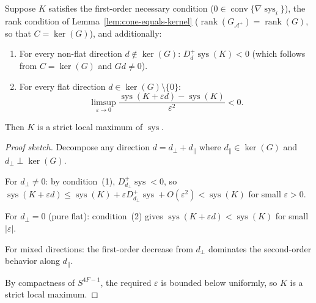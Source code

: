 \begin{proposition}
\label{prop:second-order-local-max}
  Suppose $K$ satisfies the first-order necessary condition
  ($0 \in \operatorname{conv}\{\nabla\operatorname{sys}_i\}$),
  the rank condition of Lemma~\ref{lem:cone-equals-kernel}
  ($\operatorname{rank}(G_{\mathcal{A}^+}) = \operatorname{rank}(G)$,
  so that $C = \ker(G)$), and additionally:
  \begin{enumerate}
    \item For every non-flat direction $d \notin \ker(G)$: $D_d^+ \operatorname{sys}(K) < 0$
    (which follows from $C = \ker(G)$ and $Gd \neq 0$).
    \item For every flat direction $d \in \ker(G) \setminus \{0\}$:
    \begin{equation}\label{eq:second-order-condition}
      \limsup_{\varepsilon \to 0} \frac{\operatorname{sys}(K + \varepsilon d) - \operatorname{sys}(K)}{\varepsilon^2} < 0.
    \end{equation}
  \end{enumerate}
  Then $K$ is a strict local maximum of $\operatorname{sys}$.
\end{proposition}

\begin{proof}[Proof sketch]
  Decompose any direction $d = d_\perp + d_\parallel$ where
  $d_\parallel \in \ker(G)$ and $d_\perp \perp \ker(G)$.

  For $d_\perp \neq 0$: by condition~(1),
  $D_{d_\perp}^+ \operatorname{sys} < 0$, so
  $\operatorname{sys}(K + \varepsilon d) \leq
  \operatorname{sys}(K) + \varepsilon D_{d_\perp}^+ \operatorname{sys} + O(\varepsilon^2)
  < \operatorname{sys}(K)$
  for small $\varepsilon > 0$.

  For $d_\perp = 0$ (pure flat): condition~(2) gives
  $\operatorname{sys}(K + \varepsilon d) < \operatorname{sys}(K)$
  for small $|\varepsilon|$.

  For mixed directions: the first-order decrease from $d_\perp$ dominates
  the second-order behavior along $d_\parallel$.

  By compactness of $S^{4F-1}$, the required $\varepsilon$ is bounded below
  uniformly, so $K$ is a strict local maximum.
\end{proof}


